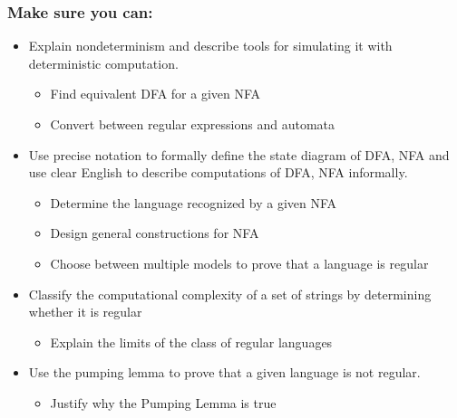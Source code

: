 \subsubsection*{Make sure you can:}
\begin{itemize}
\item Explain nondeterminism and describe tools for simulating it with deterministic computation.
\begin{itemize}
    \item Find equivalent DFA for a given NFA

    \item Convert between regular expressions and automata
 
\end{itemize}

\item Use precise notation to formally define the state diagram of DFA, NFA and 
use clear English to describe computations of DFA, NFA informally.
\begin{itemize}
   \item Determine the language recognized by a given NFA

   \item Design general constructions for NFA

   \item Choose between multiple models to prove that a language is regular
\end{itemize}
    
\item Classify the computational complexity of a set of strings by determining whether it is regular
\begin{itemize}
    \item Explain the limits of the class of regular languages

\end{itemize}

\item Use the pumping lemma to prove that a given language is not regular.
\begin{itemize}
    \item Justify why the Pumping Lemma is true

\end{itemize}
\end{itemize}

